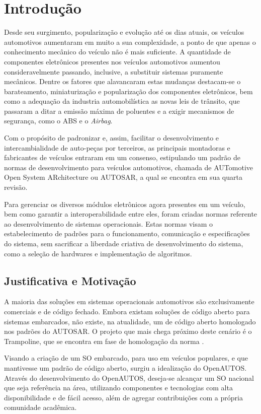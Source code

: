 \chapter{Introdução}

Desde seu surgimento, popularização e evolução até os dias atuais, os veículos automotivos aumentaram em muito a sua complexidade, a ponto de que apenas o conhecimento mecânico do veículo não é mais suficiente. A quantidade de componentes eletrônicos presentes nos veículos automotivos aumentou consideravelmente passando, inclusive, a substituir sistemas puramente mecânicos. Dentre os fatores que alavancaram estas mudanças destacam-se o barateamento, miniaturização e popularização dos componentes eletrônicos, bem como a adequação da industria automobilística as novas leis de trânsito, que passaram a ditar a emissão máxima de poluentes e a exigir mecanismos de segurança, como o ABS e o \emph{Airbag}.

Com o propósito de padronizar e, assim, facilitar o desenvolvimento e intercambialidade de auto-peças por terceiros, as principais montadoras e fabricantes de veículos entraram em um consenso, estipulando um padrão de normas de desenvolvimento para veículos automotivos, chamada de AUTomotive Open System ARchitecture ou AUTOSAR, a qual se encontra em sua quarta revisão.

Para gerenciar os diversos módulos eletrônicos agora presentes em um veículo, bem como garantir a interoperabilidade entre eles, foram criadas normas referente ao desenvolvimento de sistemas operacionais. Estas normas visam o estabelecimento de padrões para o funcionamento, comunicação e especificações do sistema, sem sacrificar a liberdade criativa de desenvolvimento do sistema, como a seleção de hardwares e implementação de algoritmos.

\section{Justificativa e Motivação}

A maioria das soluções em sistemas operacionais automotivos são exclusivamente comerciais e de código fechado. Embora existam soluções de código aberto para sistemas embarcados, não existe, na atualidade, um  de código aberto homologado nos padrões do AUTOSAR. O projeto que mais chega próximo deste cenário é o Trampoline, que se encontra em fase de homologação da norma \cite{Trampoline:HOME}.

Visando a criação de um SO embarcado, para uso em veículos populares, e que mantivesse um padrão de código aberto, surgiu a idealização do OpenAUTOS. Através do desenvolvimento do OpenAUTOS, deseja-se alcançar um SO nacional que seja referência na área, utilizando componentes e tecnologias com alta disponibilidade e de fácil acesso, além de agregar contribuições com a própria comunidade acadêmica.

